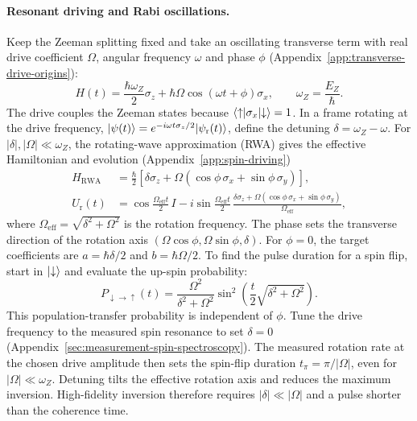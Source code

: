 \paragraph{Resonant driving and Rabi oscillations.}
Keep the Zeeman splitting fixed and take an oscillating transverse
term with real drive coefficient $\Omega$, angular frequency
$\omega$ and phase $\phi$ (Appendix~\ref{app:transverse-drive-origins}):
\begin{equation}
  H(t)=\frac{\hbar\omega_Z}{2}\sigma_z
       +\hbar\Omega\cos(\omega t+\phi)\sigma_x,
  \qquad \omega_Z=\frac{E_Z}{\hbar}.
  \label{eq:esr-lab}
\end{equation}
The drive couples the Zeeman states because
$\langle \uparrow\rvert\sigma_x\lvert \downarrow\rangle=1$.
In a frame rotating at the drive frequency,
$\lvert \psi(t)\rangle=e^{-i\omega t\sigma_z/2}\lvert \psi_{\mathrm r}(t)\rangle$,
define the detuning $\delta=\omega_Z-\omega$.
For $|\delta|,|\Omega|\ll\omega_Z$, the rotating-wave approximation
(RWA) gives the effective Hamiltonian and evolution
(Appendix~\ref{app:spin-driving})
\begin{equation}
  \begin{aligned}
    H_{\mathrm{RWA}}&=\frac{\hbar}{2}
      \left[\delta\sigma_z
        +\Omega(\cos\phi\,\sigma_x+\sin\phi\,\sigma_y)\right],\\
    U_{\mathrm r}(t)&=\cos\frac{\Omega_{\mathrm{eff}}t}{2}\,I
      -i\sin\frac{\Omega_{\mathrm{eff}}t}{2}\,
       \frac{\delta\sigma_z
         +\Omega(\cos\phi\,\sigma_x+\sin\phi\,\sigma_y)}
            {\Omega_{\mathrm{eff}}},
  \end{aligned}
  \label{eq:esr-propagator}
\end{equation}
where $\Omega_{\mathrm{eff}}=\sqrt{\delta^2+\Omega^2}$ is the rotation
frequency. The phase sets the transverse direction of the rotation
axis $(\Omega\cos\phi,\Omega\sin\phi,\delta)$. For $\phi=0$,
the target coefficients are $a=\hbar\delta/2$ and $b=\hbar\Omega/2$.
To find the pulse duration for a spin flip, start in
$\lvert \downarrow\rangle$ and evaluate the up-spin probability:
\begin{equation}
  P_{\downarrow\to\uparrow}(t)
    =\frac{\Omega^2}{\delta^2+\Omega^2}
       \sin^2\!\left(\frac{t}{2}\sqrt{\delta^2+\Omega^2}\right).
  \label{eq:rabi-probability}
\end{equation}
This population-transfer probability is independent of $\phi$.
Tune the drive frequency to the measured spin resonance to set
$\delta=0$ (Appendix~\ref{sec:measurement-spin-spectroscopy}).
The measured rotation rate at the chosen drive amplitude then sets
the spin-flip duration $t_\pi=\pi/|\Omega|$, even for
$|\Omega|\ll\omega_Z$.
Detuning tilts the effective rotation axis and reduces the maximum
inversion. High-fidelity inversion therefore requires
$|\delta|\ll|\Omega|$ and a pulse shorter than the coherence time.

